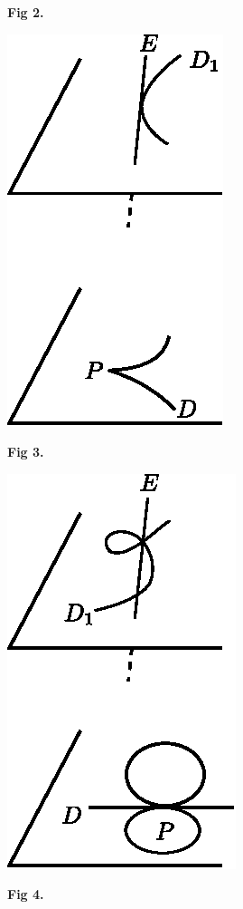 \begin{REM*}
\begin{center}
\begin{minipage}[b]{5cm}
\begin{figure}[H]
\medskip
{\bf Fig 2.}
\end{figure}
\end{minipage}

\bigskip

\begin{minipage}[b]{5cm}
\begin{figure}[H]
\centering
\includegraphics{figure/fig3.eps}

\medskip
{\bf Fig 3.}
\end{figure}
\end{minipage}
\qquad
\begin{minipage}[b]{5cm}
\begin{figure}[H]
\centering
\includegraphics{figure/fig4.eps}

\medskip
{\bf Fig 4.}
\end{figure}
\end{minipage}
\end{center}
\end{REM*}

